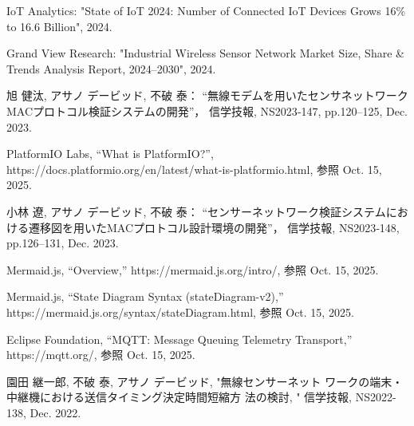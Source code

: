 \documentclass[technicalreport]{ieicej}
\begin{document}
%
%

\begin{thebibliography}{99}
 IoT Analytics: "State of IoT 2024: Number of Connected IoT Devices Grows 16\% to 16.6 Billion", 2024.  

 Grand View Research: "Industrial Wireless Sensor Network Market Size, Share \& Trends Analysis Report, 2024–2030", 2024.

旭 健汰, アサノ デービッド, 不破 泰：  
“無線モデムを用いたセンサネットワークMACプロトコル検証システムの開発”，  
信学技報,  NS2023‑147, pp.120–125, Dec. 2023.

PlatformIO Labs, “What is PlatformIO?”, 
https://docs.platformio.org/en/latest/what-is-platformio.html, 参照 Oct. 15, 2025.

小林 遼, アサノ デービッド, 不破 泰：  
“センサーネットワーク検証システムにおける遷移図を用いたMACプロトコル設計環境の開発”，  
信学技報,  NS2023‑148, pp.126–131, Dec. 2023.  


Mermaid.js, “Overview,” 
https://mermaid.js.org/intro/, 参照 Oct. 15, 2025.

Mermaid.js, “State Diagram Syntax (stateDiagram-v2),” 
https://mermaid.js.org/syntax/stateDiagram.html, 参照 Oct. 15, 2025.

Eclipse Foundation, “MQTT: Message Queuing Telemetry Transport,” 
https://mqtt.org/, 参照 Oct. 15, 2025.

 園田 継一郎, 不破 泰, アサノ デービッド, "無線センサーネット
ワークの端末・中継機における送信タイミング決定時間短縮方
法の検討, " 信学技報, NS2022-138, Dec. 2022.
\end{thebibliography}
\end{document}
